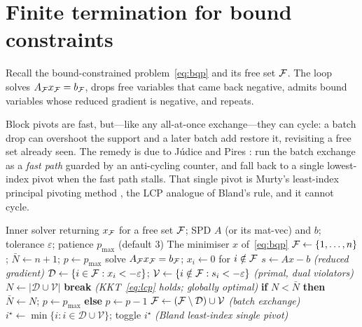 \section{Finite termination for bound constraints}

Recall the bound-constrained problem~\eqref{eq:bqp} and its free set $\mathcal{F}$. The
loop solves $A_{\mathcal{F}} x_{\mathcal{F}} = b_{\mathcal{F}}$, drops free variables that came back
negative, admits bound variables whose reduced gradient is negative, and repeats.

Block pivots are fast, but---like any all-at-once exchange---they can cycle: a batch
drop can overshoot the support and a later batch add restore it, revisiting a free
set already seen. The remedy is due to Júdice and Pires \cite{judice1994}: run the
batch exchange as a \emph{fast path} guarded by an anti-cycling counter, and fall
back to a single lowest-index pivot when the fast path stalls. That single pivot is
Murty's least-index principal pivoting method \cite{murty1988}, the LCP analogue of
Bland's rule, and it cannot cycle.

\begin{algorithm}[ht]
\caption{Guarded block principal pivoting}\label{alg:elim}
\begin{algorithmic}[1]
\Require Inner solver returning $x_{\mathcal{F}}$ for a free set $\mathcal{F}$; SPD $A$ (or its
         mat-vec) and $b$; tolerance $\varepsilon$; patience $p_{\max}$ (default $3$)
\Ensure The minimiser $x$ of~\eqref{eq:bqp}
\State $\mathcal{F} \leftarrow \{1,\ldots,n\}$;\; $\bar N \leftarrow n+1$;\; $p \leftarrow p_{\max}$
\Loop
  \State solve $A_{\mathcal{F}} x_{\mathcal{F}} = b_{\mathcal{F}}$;\; $x_i \leftarrow 0$ for $i \notin \mathcal{F}$
  \State $s \leftarrow Ax - b$
    \hfill\textit{(reduced gradient)}
  \State $\mathcal{D} \leftarrow \{i \in \mathcal{F} : x_i < -\varepsilon\}$;\;
         $\mathcal{V} \leftarrow \{i \notin \mathcal{F} : s_i < -\varepsilon\}$
    \hfill\textit{(primal, dual violators)}
  \State $N \leftarrow |\mathcal{D} \cup \mathcal{V}|$
    \State \textbf{break} \hfill\textit{(KKT~\eqref{eq:lcp} holds; globally optimal)}
    \State \textbf{if} $N < \bar N$ \textbf{ then } $\bar N \leftarrow N$;\; $p \leftarrow p_{\max}$
           \textbf{ else } $p \leftarrow p - 1$
    \State $\mathcal{F} \leftarrow (\mathcal{F} \setminus \mathcal{D}) \cup \mathcal{V}$
      \hfill\textit{(batch exchange)}
  \Else
    \State $i^\star \leftarrow \min\{i : i \in \mathcal{D}\cup\mathcal{V}\}$;
           toggle $i^\star$
      \hfill\textit{(Bland least-index single pivot)}
  \EndIf
\EndLoop
\end{algorithmic}
\end{algorithm}

